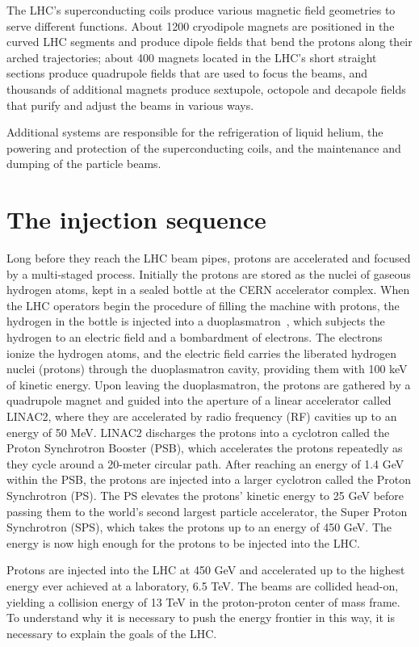 The LHC's superconducting coils produce various magnetic field geometries to serve different functions. About 1200 cryodipole magnets are positioned in the curved LHC segments and produce dipole fields that bend the protons along their arched trajectories;  about 400 magnets located in the LHC's short straight sections produce quadrupole fields that are used to focus the beams, and thousands of additional magnets produce sextupole, octopole and decapole fields that purify and adjust the beams in various ways. 

Additional systems are responsible for the refrigeration of liquid helium, the powering and protection of the superconducting coils, and the maintenance and dumping of the particle beams. 

\section{The injection sequence}
Long before they reach the LHC beam pipes, protons are accelerated and focused by a multi-staged process. Initially the protons are stored as the nuclei of gaseous hydrogen atoms, kept in a sealed bottle at the CERN accelerator complex. When the LHC operators begin the procedure of filling the machine with protons, the hydrogen in the bottle is injected into a duoplasmatron~\cite{Breskin:1244506}, which subjects the hydrogen to an electric field and a bombardment of electrons. The electrons ionize the hydrogen atoms, and the electric field carries the liberated hydrogen nuclei (protons) through the duoplasmatron cavity, providing them with 100 keV of kinetic energy. Upon leaving the duoplasmatron, the protons are gathered by a quadrupole magnet and guided into the aperture of a linear accelerator called LINAC2, where they are accelerated by radio frequency (RF) cavities up to an energy of 50 MeV. LINAC2 discharges the protons into a cyclotron called the Proton Synchrotron Booster (PSB), which accelerates the protons repeatedly as they cycle around a 20-meter circular path. After reaching an energy of 1.4 GeV within the PSB, the protons are injected into a larger cyclotron called the Proton Synchrotron (PS). The PS elevates the protons' kinetic energy to 25 GeV before passing them to the world's second largest particle accelerator, the Super Proton Synchrotron (SPS), which takes the protons up to an energy of 450 GeV. The energy is now high enough for the protons to be injected into the LHC. 

Protons are injected into the LHC at 450 GeV and accelerated up to the highest energy ever achieved at a laboratory, 6.5 TeV. The beams are collided head-on, yielding a collision energy of 13 TeV in the proton-proton center of mass frame. To understand why it is necessary to push the energy frontier in this way, it is necessary to explain the goals of the LHC.


